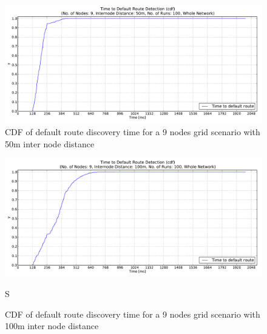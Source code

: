 \begin{figure}[htbp]
  \begin{center}
    \leavevmode
      \includegraphics[width=\textwidth]
      {Pics/results/9/MRHOF/grid/dist50_montecarlo_cdf_hist.pdf}
   \caption{CDF of default route discovery time for a 9 nodes grid scenario with 50m inter node distance}
   \label{fig:9_MRHOF_grid_50_cdf}
  \end{center}
\end{figure}

\begin{figure}[htbp]
  \begin{center}
    \leavevmode
      \includegraphics[width=\textwidth]
      {Pics/results/9/MRHOF/grid/dist100_montecarlo_cdf_hist.pdf}
   \caption{CDF of default route discovery time for a 9 nodes grid scenario with 100m inter node distance}
   \label{fig:9_MRHOF_grid_100_cdf}
  \end{center}S
\end{figure}


